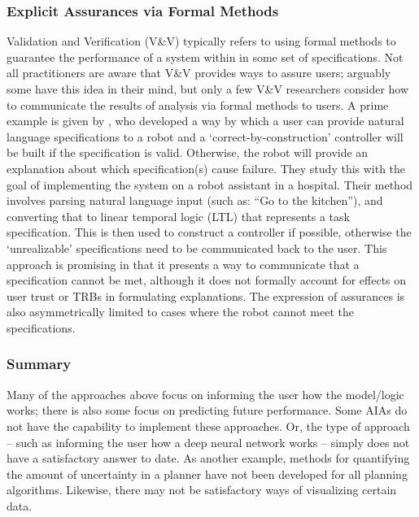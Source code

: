 \subsubsection{Explicit Assurances via Formal Methods} \label{sec:VV}
    Validation and Verification (V\&V) typically refers to using formal methods to guarantee the performance of a system within in some set of specifications. Not all practitioners are aware that V\&V provides ways to assure users; arguably some have this idea in their mind, but only a few V\&V researchers consider how to communicate the results of analysis via formal methods to users. A prime example is given by \citet{Raman2013-mz}, who developed a way by which a user can provide natural language specifications to a robot and a `correct-by-construction' controller will be built if the specification is valid. Otherwise, the robot will provide an explanation about which specification(s) cause failure. They study this with the goal of implementing the system on a robot assistant in a hospital. Their method involves parsing natural language input (such as: ``Go to the kitchen''), and converting that to linear temporal logic (LTL) that represents a task specification. This is then used to construct a controller if possible, otherwise the `unrealizable' specifications need to be communicated back to the user. This approach is promising in that it presents a way to communicate that a specification cannot be met, although it does not formally account for effects on user trust or TRBs in formulating explanations. The expression of assurances is also asymmetrically limited to cases where the robot cannot meet the specifications. 

\subsubsection{Summary}
    Many of the approaches above focus on informing the user how the model/logic works; there is also some focus on predicting future performance. Some AIAs do not have the capability to implement these approaches. Or, the type of approach -- such as informing the user how a deep neural network works -- simply does not have a satisfactory answer to date. As another example, methods for quantifying the amount of uncertainty in a planner have not been developed for all planning algorithms. Likewise, there may not be satisfactory ways of visualizing certain data. %

